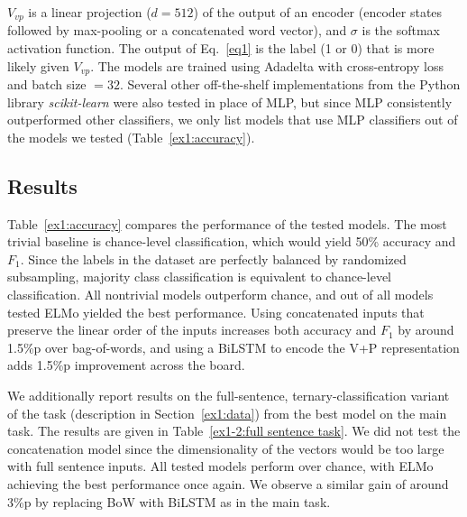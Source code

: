 \documentclass[letterpaper]{article} %
\begin{document}
\noindent $V_{vp}$ is a linear projection ($d=512$) of the output of an encoder (encoder states followed by max-pooling or a concatenated word vector), and $\sigma$ is the softmax activation function. The output of Eq.~\ref{eq1} is the label (1 or 0) that is more likely given $V_{vp}$. The models are trained using Adadelta \cite{zeiler2012adadelta} with cross-entropy loss and batch size $=32$. Several other off-the-shelf implementations from the Python library \textit{scikit-learn} were also tested in place of MLP, but since MLP consistently outperformed other classifiers, we only list models that use MLP classifiers out of the models we tested (Table~\ref{ex1:accuracy}).

\subsection{Results}
Table~\ref{ex1:accuracy} compares the performance of the tested models. The most trivial baseline is chance-level classification, which would yield 50\% accuracy and $F_1$. Since the labels in the dataset are perfectly balanced by randomized subsampling, majority class classification is equivalent to chance-level classification. All nontrivial models outperform chance, and out of all models tested ELMo yielded the best performance. Using concatenated inputs that preserve the linear order of the inputs increases both accuracy and $F_1$ by around 1.5\%p over bag-of-words, and using a BiLSTM to encode the V+P representation adds 1.5\%p improvement across the board. 


We additionally report results on the full-sentence, ternary-classification variant of the task (description in Section~\ref{ex1:data}) from the best model on the main task. The results are given in Table~\ref{ex1-2:full sentence task}. We did not test the concatenation model since the dimensionality of the vectors would be too large with full sentence inputs. All tested models perform over chance, with ELMo achieving the best performance once again. We observe a similar gain of around 3\%p by replacing BoW with BiLSTM as in the main task.
\end{document}
